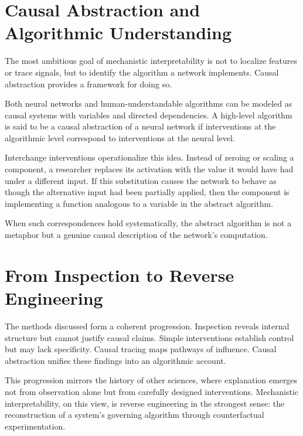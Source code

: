 \documentclass[11pt]{article}
\begin{document}
\section{Causal Abstraction and Algorithmic Understanding}

The most ambitious goal of mechanistic interpretability is not to localize
features or trace signals, but to identify the algorithm a network implements.
Causal abstraction provides a framework for doing so.

Both neural networks and human-understandable algorithms can be modeled as
causal systems with variables and directed dependencies. A high-level algorithm
is said to be a causal abstraction of a neural network if interventions at the
algorithmic level correspond to interventions at the neural level.

Interchange interventions operationalize this idea. Instead of zeroing or
scaling a component, a researcher replaces its activation with the value it
would have had under a different input. If this substitution causes the network
to behave as though the alternative input had been partially applied, then the
component is implementing a function analogous to a variable in the abstract
algorithm.

When such correspondences hold systematically, the abstract algorithm is not a
metaphor but a genuine causal description of the network’s computation.

\section{From Inspection to Reverse Engineering}

The methods discussed form a coherent progression. Inspection reveals internal
structure but cannot justify causal claims. Simple interventions establish
control but may lack specificity. Causal tracing maps pathways of influence.
Causal abstraction unifies these findings into an algorithmic account.

This progression mirrors the history of other sciences, where explanation
emerges not from observation alone but from carefully designed interventions.
Mechanistic interpretability, on this view, is reverse engineering in the
strongest sense: the reconstruction of a system’s governing algorithm through
counterfactual experimentation.
\end{document}
